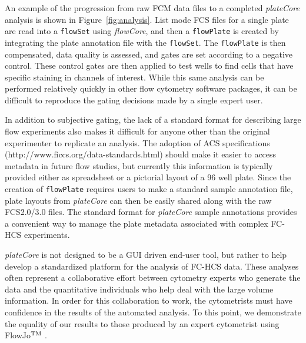 \documentclass[12pt]{article}
\newcommand{\Robject}[1]{{\texttt{#1}}}
\newcommand{\Rpackage}[1]{{\textit{#1}}}
\def\tm{$^{\rm \text{TM }}$}
\begin{document}
An example of the progression from raw FCM data files to a completed \Rpackage{plateCore} analysis is shown in Figure~\ref{fig:analysis}.
List mode FCS files for a single plate are read into a \Robject{flowSet} using \Rpackage{flowCore}, and then a \Robject{flowPlate} is created by integrating
the plate annotation file with the \Robject{flowSet}. The \Robject{flowPlate} is then compensated, data quality is assessed, and gates
are set according to a negative control. These control gates are then applied to test wells to find cells that have specific staining
in channels of interest. While this same analysis can be performed relatively quickly in 
other flow cytometry software packages, it can be difficult to reproduce the gating decisions made by a single expert user.

In addition to subjective gating, the lack of a standard format for describing large flow experiments also
makes it difficult for anyone other than the original experimenter to replicate an analysis. 
The adoption of ACS specifications (http://www.ficcs.org/data-standards.html) should make it easier to access metadata in future flow studies, but currently
this information is typically provided either as spreadsheet or a pictorial layout of a 96 well plate. 
Since the creation of \Robject{flowPlate} requires users to make a standard sample annotation file, plate layouts from \Rpackage{plateCore}
can then be easily shared along with the raw FCS2.0/3.0 files. 
The standard format for \Rpackage{plateCore} sample annotations provides a convenient way to manage the plate metadata
associated with complex FC-HCS experiments.

\Rpackage{plateCore} is not designed to be a GUI driven end-user tool, but rather to help develop a standardized platform for the analysis of FC-HCS data.
These analyses often represent a collaborative effort between cytometry experts who generate the data and the quantitative individuals who help
deal with the large volume information. In order for this collaboration to work, the cytometrists must have confidence in the
results of the automated analysis. To this point, we demonstrate the equality of our results to those produced by an expert
cytometrist using FlowJo\tm.
\end{document}
